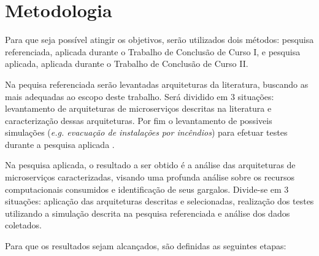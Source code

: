 \section{Metodologia}
\label{met}

Para que seja poss\'{i}vel atingir os objetivos, serão utilizados dois métodos: pesquisa referenciada, aplicada durante o Trabalho de Conclusão de Curso I, e pesquisa aplicada, aplicada durante o Trabalho de Conclusão de Curso II.

Na pequisa referenciada serão levantadas arquiteturas da literatura, buscando as mais adequadas ao escopo deste trabalho. Será dividido em 3 situações: levantamento de arquiteturas de microserviços descritas na literatura e caracterização dessas arquiteturas. Por fim o levantamento de possiveis simulações (\textit{e.g. evacuação de instalações por incêndios}) para efetuar testes durante a pesquisa aplicada .

Na pesquisa aplicada, o resultado a ser obtido é a análise das arquiteturas de microserviços caracterizadas, visando uma profunda análise sobre os recursos computacionais consumidos e identificação de seus gargalos. Divide-se em 3 situações: aplicação das arquiteturas descritas e selecionadas, realização dos testes utilizando a simulação descrita na pesquisa referenciada e análise dos dados coletados.

Para que os resultados sejam alcançados, são definidas as seguintes etapas:

